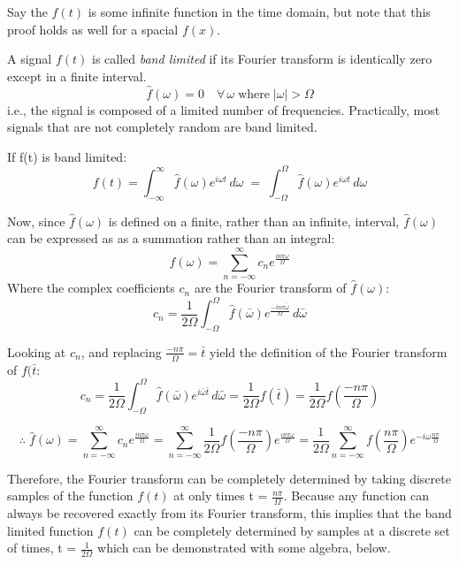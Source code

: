 \documentclass[12pt]{article}
\newcommand{\inftyint}{\int_{-\infty}^{\infty}}
\begin{document}
Say the \(f(t)\) is some infinite function in the time domain, but note that
this proof holds as well for a spacial \(f(x)\).

A signal \(f(t)\) is called \emph{band limited} if its Fourier transform is
identically zero except in a finite interval.  \[\hat{f}(\omega) = 0 \quad
\forall \, \omega \; \text{where} \; |\omega| > \Omega\] i.e., the signal is
composed of a limited number of frequencies. Practically, most signals that are
not completely random are band limited.

If f(t) is band limited: \[f(t) = \inftyint \hat{f}(\omega)e^{i\omega t}
\,d\omega \; = \; \int_{-\Omega}^{\Omega} \hat{f}(\omega)e^{i\omega t}
\,d\omega\]

Now, since \( \hat{f}(\omega) \) is defined on a finite, rather than an
infinite, interval, \( \hat{f}(\omega) \) can be expressed as as a summation
rather than an integral: \[\hat{f}(\omega) = \sum_{n = -\infty}^{\infty}
c_{n}e^{\frac{i n \pi \omega}{\Omega}} \] Where the complex coefficients \(
c_n\) are the Fourier transform of \( \hat{f}(\omega) \): \[ c_n =
\frac{1}{2\Omega} \int_{-\Omega}^{\Omega} \hat{f}(\bar{\omega})e^{\frac{-i n
\pi \bar{ \omega}}{\Omega}}\,d\bar{\omega}\]

Looking at \(c_n\), and replacing \( \frac{-n\pi}{\Omega} = \bar{t}\) yield the
definition of the Fourier transform of \( f(\bar{t}\): \[ c_n =
\frac{1}{2\Omega} \int_{-\Omega}^{\Omega}
\hat{f}(\bar{\omega})e^{i\bar{\omega}\bar{t}}\,d\bar{\omega} =
\frac{1}{2\Omega} f(\bar{t}) = \frac{1}{2\Omega} f(\frac{-n\pi}{\Omega})\]

\begin{equation} \label{eq:nfhat} \therefore \; \hat{f}(\omega) = \sum_{n =
    -\infty}^{\infty} c_{n}e^{\frac{i n \pi \omega}{\Omega}} = \sum_{n =
    -\infty}^{\infty} \frac{1}{2\Omega} f(\frac{-n\pi}{\Omega})e^{\frac{i n \pi
    \omega}{\Omega}} = \frac{1}{2\Omega} \sum_{n = -\infty}^{\infty}
    f(\frac{n\pi}{\Omega})e^{-i \omega \frac{n \pi}{\Omega} } \end{equation}

Therefore, the Fourier transform can be completely determined by taking
discrete samples of the function \( f(t) \) at only times t = \(
\frac{n\pi}{\Omega}\). Because any function can always be recovered exactly
from its Fourier transform, this implies that the band limited function \( f(t)
\) can be completely determined by samples at a discrete set of times, t = \(
\frac{1}{2\Omega} \) which can be demonstrated with some algebra, below.
\end{document}
